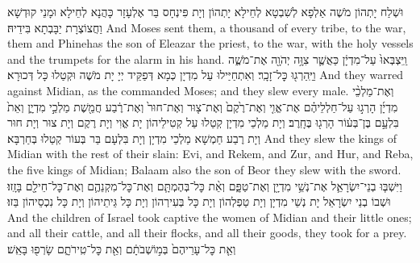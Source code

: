 {וּשְׁלַח יָתְהוֹן מֹשֶׁה אַלְפָא לְשִׁבְטָא לְחֵילָא יָתְהוֹן וְיָת פִּינְחָס בַּר אֶלְעָזָר כָּהֲנָא לְחֵילָא וּמָנֵי קוּדְשָׁא וַחֲצוֹצְרָת יַבָּבְתָא בִּידֵיהּ׃}
{And Moses sent them, a thousand of every tribe, to the war, them and Phinehas the son of Eleazar the priest, to the war, with the holy vessels and the trumpets for the alarm in his hand.}{}
{וַֽיִּצְבְּאוּ֙ עַל־מִדְיָ֔ן כַּאֲשֶׁ֛ר צִוָּ֥ה יְהֹוָ֖ה אֶת־מֹשֶׁ֑ה וַיַּֽהַרְג֖וּ כׇּל־זָכָֽר׃}
{וְאִתְחַיַּילוּ עַל מִדְיָן כְּמָא דְּפַקֵּיד יְיָ יָת מֹשֶׁה וּקְטַלוּ כָּל דְּכוּרָא׃}
{And they warred against Midian, as the \lord\space commanded Moses; and they slew every male.}{}
{וְאֶת־מַלְכֵ֨י מִדְיָ֜ן הָרְג֣וּ עַל־חַלְלֵיהֶ֗ם אֶת־אֱוִ֤י וְאֶת־רֶ֙קֶם֙ וְאֶת־צ֤וּר וְאֶת־חוּר֙ וְאֶת־רֶ֔בַע חֲמֵ֖שֶׁת מַלְכֵ֣י מִדְיָ֑ן וְאֵת֙ בִּלְעָ֣ם בֶּן־בְּע֔וֹר הָרְג֖וּ בֶּחָֽרֶב׃
}
{וְיָת מַלְכֵי מִדְיָן קְטַלוּ עַל קְטִילֵיהוֹן יָת אֱוִי וְיָת רֶקֶם וְיָת צוּר וְיָת חוּר וְיָת רֶבַע חַמְשָׁא מַלְכֵי מִדְיָן וְיָת בִּלְעָם בַּר בְּעוֹר קְטַלוּ בְּחַרְבָּא׃}
{And they slew the kings of Midian with the rest of their slain: Evi, and Rekem, and Zur, and Hur, and Reba, the five kings of Midian; Balaam also the son of Beor they slew with the sword.}{}
{וַיִּשְׁבּ֧וּ בְנֵי־יִשְׂרָאֵ֛ל אֶת־נְשֵׁ֥י מִדְיָ֖ן וְאֶת־טַפָּ֑ם וְאֵ֨ת כׇּל־בְּהֶמְתָּ֧ם וְאֶת־כׇּל־מִקְנֵהֶ֛ם וְאֶת־כׇּל־חֵילָ֖ם בָּזָֽזוּ׃}
{וּשְׁבוֹ בְנֵי יִשְׂרָאֵל יָת נְשֵׁי מִדְיָן וְיָת טַפְלְהוֹן וְיָת כָּל בְּעִירְהוֹן וְיָת כָּל גֵּיתֵיהוֹן וְיָת כָּל נִכְסֵיהוֹן בַּזוּ׃}
{And the children of Israel took captive the women of Midian and their little ones; and all their cattle, and all their flocks, and all their goods, they took for a prey.}{}
{וְאֵ֤ת כׇּל־עָרֵיהֶם֙ בְּמ֣וֹשְׁבֹתָ֔ם וְאֵ֖ת כׇּל־טִֽירֹתָ֑ם שָׂרְפ֖וּ בָּאֵֽשׁ׃
}
